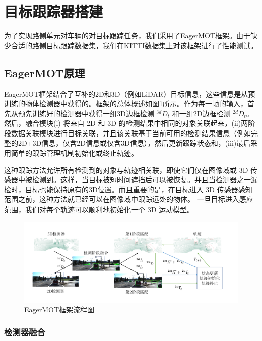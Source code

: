\newpage
{}
\section{目标跟踪器搭建}

为了实现路侧单元对车辆的对目标跟踪任务，我们采用了EagerMOT框架。由于缺少合适的路侧目标跟踪数据集，我们在KITTI数据集上对该框架进行了性能测试。

\subsection{EagerMOT原理}

EagerMOT框架结合了互补的2D和3D（例如LiDAR）目标信息，这些信息是从预训练的物体检测器中获得的。框架的总体概述如图\ref{fig18}所示。作为每一帧的输入，首先从预先训练好的检测器中获得一组3D边框检测 $^{3d}D_t$ 和一组2D边框检测 $^{2d}D_t$。然后，融合模块(i) 将来自 2D 和 3D 的检测结果中相同的对象关联起来，(ii)两阶段数据关联模块进行目标关联，并且该关联基于当前可用的检测结果信息（例如完整的2D+3D信息，仅含2D信息或仅含3D信息），然后更新跟踪状态和，(iii)最后采用简单的跟踪管理机制初始化或终止轨迹。

这种跟踪方法允许所有检测到的对象与轨迹相关联，即使它们仅在图像域或 3D 传感器中被检测到。这样，当目标被短时间遮挡后可以被恢复。并且当检测器之一漏检时，目标也能保持原有的3D位置。而且重要的是，在目标进入 3D 传感器感知范围之前，这种方法就已经可以在图像域中跟踪远处的物体。 一旦目标进入感应范围，我们对每个轨迹可以顺利地初始化一个 3D 运动模型。

\begin{figure}[htb] 
    \center
    \includegraphics[width=\textwidth]{figure/fig18.png}
    \caption{EagerMOT框架流程图}
    \label{fig18}
\end{figure}

\subsubsection{检测器融合}
\label{sec3.1.1}

